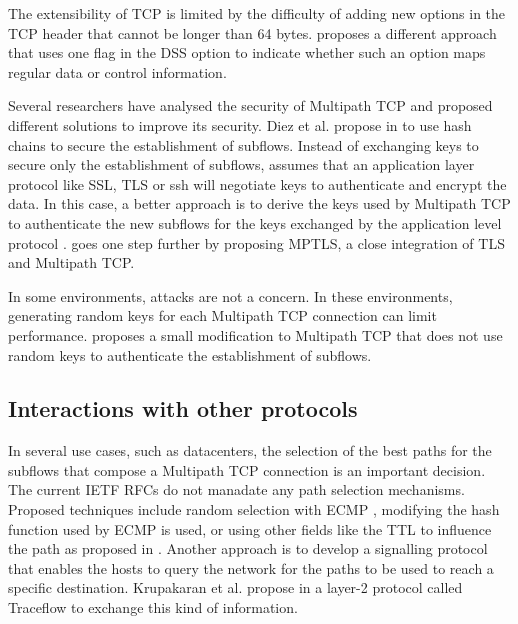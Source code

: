 The extensibility of TCP is limited by the difficulty of adding new options in the TCP header that cannot be longer than 64 bytes. \cite{draft-paasch-mptcp-control-stream} proposes a different approach that uses one flag in the DSS option to 
indicate whether such an option maps regular data or control information. 

Several researchers have analysed the security of Multipath TCP
and proposed different solutions to improve its security. 
Diez et al. propose in \cite{Diez_Security:2011} to use hash chains to secure the establishment of subflows. Instead of exchanging keys to secure only the establishment of subflows, \cite{draft-paasch-mptcp-ssl} assumes that an application layer protocol like SSL, TLS or ssh will negotiate keys to authenticate and encrypt the data. In this case, a better
approach is to derive the keys used by Multipath TCP to authenticate the new subflows for the keys exchanged by the
application level protocol \cite{draft-paasch-mptcp-ssl}. 
\cite{draft-bonaventure-mptcp-tls} goes one step further by
proposing MPTLS, a close integration of TLS and Multipath TCP. 

In some environments, attacks are not a concern. In these environments, generating random keys for each Multipath TCP
connection can limit performance. \cite{draft-paasch-mptcp-lowoverhead} proposes a small modification to Multipath TCP that does not use random keys
to authenticate the establishment of subflows.


\subsection{Interactions with other protocols}

In several use cases, such as datacenters, the selection of the best paths for the subflows that compose a Multipath TCP connection is an important decision. The current IETF RFCs do not manadate any path selection mechanisms. Proposed techniques include random selection with ECMP \cite{Raiciu_Datacenter:2011}, modifying the hash function used by ECMP \cite{Detal_Revisiting:2013} is used, or using other fields like the TTL to influence the path as proposed in \cite{Kabbani_Flowbender:2014}. Another approach is to develop a signalling protocol that enables the hosts to query the network for the paths to be used to reach a specific destination. Krupakaran et al. propose in \cite{Krupakaran_Optimized:2015} a layer-2 protocol called Traceflow to exchange this kind of information.

